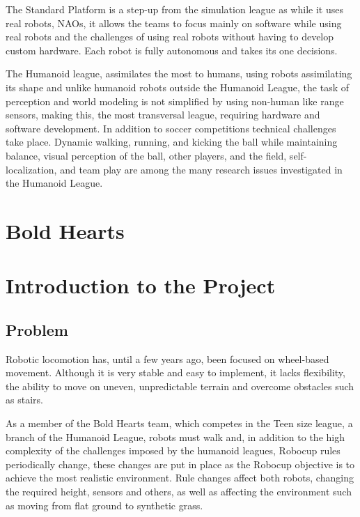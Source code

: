     The Standard Platform is a step-up from the simulation league as while it uses real robots, NAOs, it allows the teams to focus mainly on software while using real robots and the challenges of using real robots without having to develop custom hardware. Each robot is fully autonomous and takes its one decisions.

    The Humanoid league, assimilates the most to humans, using robots assimilating its shape and unlike humanoid robots outside the Humanoid League, the task of perception and world modeling is not simplified by using non-human like range sensors, making this, the most transversal league, requiring hardware and software development. 
    In addition to soccer competitions technical challenges take place. 
    Dynamic walking, running, and kicking the ball while maintaining balance, visual perception of the ball, other players, and the field, self-localization, and team play are among the many research issues investigated in the Humanoid League.

    \section{Bold Hearts}

    \section{Introduction to the Project}

        \subsection{Problem}
        Robotic locomotion has, until a few years ago, been focused on wheel-based movement. Although it is very stable and easy to implement, it lacks flexibility, the ability to move on uneven, unpredictable terrain and overcome obstacles such as stairs.

        As a member of the Bold Hearts team, which competes in the Teen size league, a branch of the Humanoid League, robots must walk and, in addition to the high complexity of the challenges imposed by the humanoid leagues, Robocup rules periodically change, these changes are put in place as the Robocup objective is to achieve the most realistic environment. Rule changes affect both robots, changing the required height, sensors and others, as well as affecting the environment such as moving from flat ground to synthetic grass.

